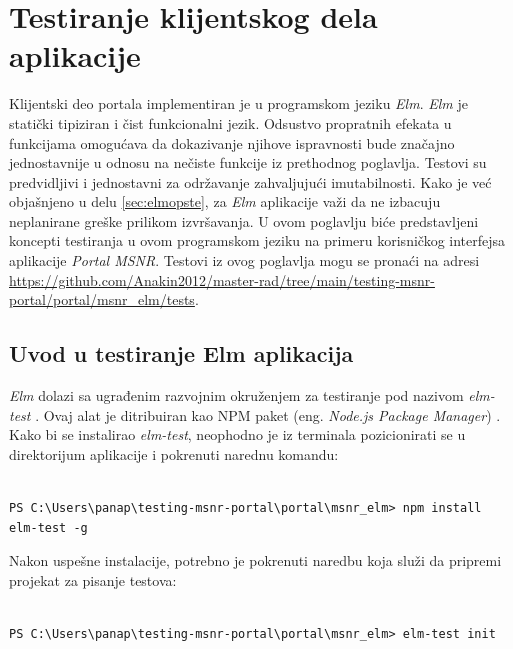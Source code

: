\documentclass[12pt,oneside]{memoir}
\begin{document}
\chapter{Testiranje klijentskog dela aplikacije}
\label{chp:testiranjeelm}
\par Klijentski deo portala implementiran je u programskom jeziku \emph{Elm}. \emph{Elm} je statički tipiziran i čist funkcionalni jezik. Odsustvo propratnih efekata u funkcijama omogućava da dokazivanje njihove ispravnosti bude značajno jednostavnije u odnosu na nečiste funkcije iz prethodnog poglavlja. Testovi su predvidljivi i jednostavni za održavanje zahvaljujući imutabilnosti. Kako je već objašnjeno u delu \ref{sec:elmopste}, za \emph{Elm} aplikacije važi da ne izbacuju neplanirane greške prilikom izvršavanja. U ovom poglavlju biće predstavljeni koncepti testiranja u ovom programskom jeziku na primeru korisničkog interfejsa aplikacije \emph{Portal MSNR}. Testovi iz ovog poglavlja mogu se pronaći na adresi \url{https://github.com/Anakin2012/master-rad/tree/main/testing-msnr-portal/portal/msnr_elm/tests}.

\section{Uvod u testiranje Elm aplikacija}
\label{sec:uvod-elm}

\par \emph{Elm} dolazi sa ugrađenim razvojnim okruženjem za testiranje pod nazivom \emph{elm-test} \cite{elm-test}. Ovaj alat je ditribuiran kao NPM paket (eng. \emph{Node.js Package Manager}) \cite{npm}. Kako bi se instalirao \emph{elm-test}, neophodno je iz terminala pozicionirati se u direktorijum aplikacije i pokrenuti narednu komandu: 

\begin{minipage}{\linewidth}
\begin{lstlisting}[style=DOS]

PS C:\Users\panap\testing-msnr-portal\portal\msnr_elm> npm install elm-test -g

\end{lstlisting}
\end{minipage}

\par Nakon uspešne instalacije, potrebno je pokrenuti naredbu koja služi da pripremi projekat za pisanje testova: 

\begin{minipage}{\linewidth}
\begin{lstlisting}[style=DOS]

PS C:\Users\panap\testing-msnr-portal\portal\msnr_elm> elm-test init

\end{lstlisting}
\end{minipage}
\end{document}
